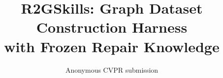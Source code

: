 \documentclass[10pt,twocolumn,letterpaper]{article}
\title{R2GSkills: Graph Dataset Construction Harness\\with Frozen Repair Knowledge}
\author{Anonymous CVPR submission}
\begin{document}
\maketitle










{
    \small
    
    
}

% 
\end{document}
